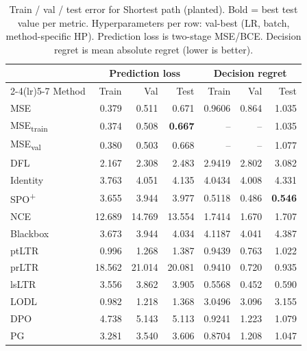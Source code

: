 \begin{table}[t]
\centering
\caption{Train / val / test error for Shortest path (planted). Bold = best test value per metric. Hyperparameters per row: val-best (LR, batch, method-specific HP). Prediction loss is two-stage MSE/BCE. Decision regret is mean absolute regret (lower is better).}
\label{tab:err-sp-planted}
\setlength{\tabcolsep}{4pt}
\renewcommand{\arraystretch}{1.05}
\begin{tabular}{@{}lrrrrrr@{}}
\toprule
& \multicolumn{3}{c}{Prediction loss} & \multicolumn{3}{c}{Decision regret} \\
\cmidrule(lr){2-4}\cmidrule(lr){5-7}
Method & Train & Val & Test & Train & Val & Test \\
\midrule
MSE & 0.379 & 0.511 & 0.671 & 0.9606 & 0.864 & 1.035 \\
MSE\textsubscript{train} & 0.374 & 0.508 & \textbf{0.667} & -- & -- & 1.035 \\
MSE\textsubscript{val} & 0.380 & 0.503 & 0.668 & -- & -- & 1.077 \\
DFL & 2.167 & 2.308 & 2.483 & 2.9419 & 2.802 & 3.082 \\
Identity & 3.763 & 4.051 & 4.135 & 4.0434 & 4.008 & 4.331 \\
SPO\textsuperscript{+} & 3.655 & 3.944 & 3.977 & 0.5118 & 0.486 & \textbf{0.546} \\
NCE & 12.689 & 14.769 & 13.554 & 1.7414 & 1.670 & 1.707 \\
Blackbox & 3.673 & 3.944 & 4.034 & 4.1187 & 4.041 & 4.387 \\
ptLTR & 0.996 & 1.268 & 1.387 & 0.9439 & 0.763 & 1.022 \\
prLTR & 18.562 & 21.014 & 20.081 & 0.9410 & 0.720 & 0.935 \\
lsLTR & 3.556 & 3.862 & 3.905 & 0.5568 & 0.452 & 0.590 \\
LODL & 0.982 & 1.218 & 1.368 & 3.0496 & 3.096 & 3.155 \\
DPO & 4.738 & 5.143 & 5.113 & 0.9241 & 1.223 & 1.079 \\
PG & 3.281 & 3.540 & 3.606 & 0.8704 & 1.208 & 1.047 \\
\bottomrule
\end{tabular}
\end{table}

